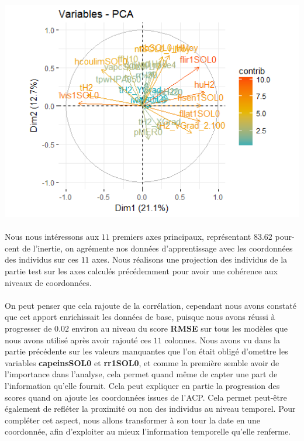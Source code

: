 \documentclass[14pt, openany]{article}
\begin{document}
\begin{center}
\includegraphics[width=18cm]{Images/ACP2.png}
\end{center}
\paragraph{}
Nous nous intéressons aux $11$ premiers axes principaux, représentant $83.62$ pour-cent de l'inertie, on agrémente nos données d'apprentissage avec les coordonnées des individus sur ces $11$ axes. Nous réalisons une projection des individus de la partie test sur les axes calculés précédemment pour avoir une cohérence aux niveaux de coordonnées.
 
\paragraph{}
On peut penser que cela rajoute de la corrélation, cependant nous avons constaté que cet apport enrichissait les données de base, puisque nous avons réussi à progresser de $0.02$ environ au niveau du score \textbf{RMSE} sur tous les modèles que nous avons utilisé après avoir rajouté ces $11$ colonnes. Nous avons vu dans la partie précédente sur les valeurs manquantes que l'on était obligé d'omettre les variables \textbf{capeinsSOL0} et \textbf{rr1SOL0}, et comme la première semble avoir de l'importance dans l'analyse, cela permet quand même de capter une part de l'information qu'elle fournit. Cela peut expliquer en partie la progression des scores quand on ajoute les coordonnées issues de l'ACP. Cela permet peut-être également de refléter la proximité ou non des individus au niveau temporel. Pour compléter cet aspect, nous allons transformer à son tour la date en une coordonnée, afin d'exploiter au mieux l'information temporelle qu'elle renferme. 
\end{document}

